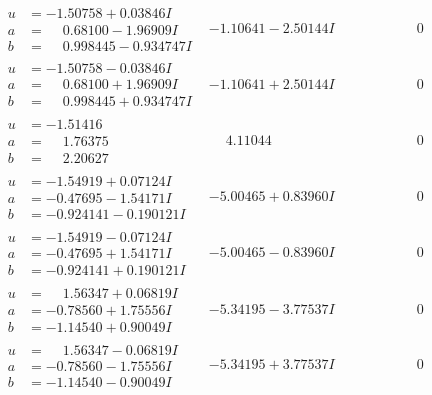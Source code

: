 \documentclass[1p]{elsarticle_modified}
\theoremstyle{definition}
\begin{document}
$$\begin{array}{c|c|c}
\begin{aligned}
u &= -1.50758 + 0.03846 I \\
a &= \phantom{-}0.68100 - 1.96909 I \\
b &= \phantom{-}0.998445 - 0.934747 I\end{aligned}
 & -1.10641 - 2.50144 I & \phantom{-0.000000 } 0 \\ \hline\begin{aligned}
u &= -1.50758 - 0.03846 I \\
a &= \phantom{-}0.68100 + 1.96909 I \\
b &= \phantom{-}0.998445 + 0.934747 I\end{aligned}
 & -1.10641 + 2.50144 I & \phantom{-0.000000 } 0 \\ \hline\begin{aligned}
u &= -1.51416\phantom{ +0.000000I} \\
a &= \phantom{-}1.76375\phantom{ +0.000000I} \\
b &= \phantom{-}2.20627\phantom{ +0.000000I}\end{aligned}
 & \phantom{-}4.11044\phantom{ +0.000000I} & \phantom{-0.000000 } 0 \\ \hline\begin{aligned}
u &= -1.54919 + 0.07124 I \\
a &= -0.47695 - 1.54171 I \\
b &= -0.924141 - 0.190121 I\end{aligned}
 & -5.00465 + 0.83960 I & \phantom{-0.000000 } 0 \\ \hline\begin{aligned}
u &= -1.54919 - 0.07124 I \\
a &= -0.47695 + 1.54171 I \\
b &= -0.924141 + 0.190121 I\end{aligned}
 & -5.00465 - 0.83960 I & \phantom{-0.000000 } 0 \\ \hline\begin{aligned}
u &= \phantom{-}1.56347 + 0.06819 I \\
a &= -0.78560 + 1.75556 I \\
b &= -1.14540 + 0.90049 I\end{aligned}
 & -5.34195 - 3.77537 I & \phantom{-0.000000 } 0 \\ \hline\begin{aligned}
u &= \phantom{-}1.56347 - 0.06819 I \\
a &= -0.78560 - 1.75556 I \\
b &= -1.14540 - 0.90049 I\end{aligned}
 & -5.34195 + 3.77537 I & \phantom{-0.000000 } 0\\

\end{array}$$
\end{document}
